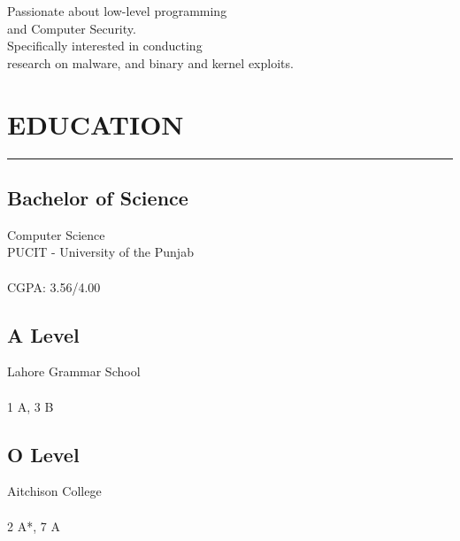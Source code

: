 \documentclass[]{resume}
\begin{document}
%
%

\begin{minipage}[t]{0.33\textwidth}

    \begin{large}
        \\
    \end{large}

    \vspace{4pt}
    \noindent {}\\
    Passionate about low-level programming \\and Computer Security.\\Specifically interested in conducting\\research on malware, and binary and kernel exploits.



    \section{EDUCATION}
    \noindent\rule{5cm}{0.4pt}

    \subsection{Bachelor of Science}
    \noindent Computer Science\\
    PUCIT - University of the Punjab\\
    \\
    CGPA: 3.56/4.00

    \vspace{8pt}
    \subsection{A Level}
    \noindent Lahore Grammar School\\
    \\
    1 A, 3 B

    \vspace{8pt}
    \subsection{O Level}
    \noindent Aitchison College\\
    \\
    2 A*, 7 A


\end{minipage}
\end{document}
